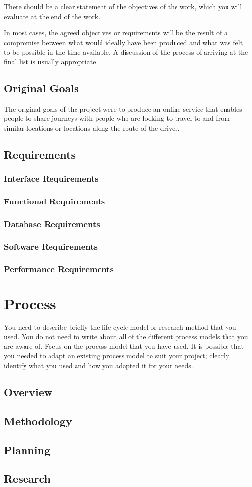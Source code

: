 There should be a clear statement of the objectives of the work, which you will evaluate at the end of the work. 

In most cases, the agreed objectives or requirements will be the result of a compromise between what would ideally have been produced and what was felt to be possible in the time available. A discussion of the process of arriving at the final list is usually appropriate.

\subsection{Original Goals}
	The original goals of the project were to produce an online service that enables people to share journeys with people who are looking to travel to and from similar locations or locations along the route of the driver. 
	
\subsection{Requirements}
\subsubsection{Interface Requirements}
\subsubsection{Functional Requirements}
\subsubsection{Database Requirements}
\subsubsection{Software Requirements}
\subsubsection{Performance Requirements}

\section{Process}
You need to describe briefly the life cycle model or research method that you used. You do not need to write about all of the different process models that you are aware of. Focus on the process model that you have used. It is possible that you needed to adapt an existing process model to suit your project; clearly identify what you used and how you adapted it for your needs.

\subsection{Overview}
\subsection{Methodology}
\subsection{Planning}
\subsection{Research}
